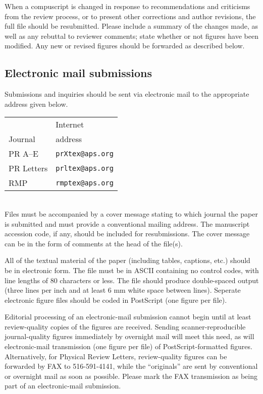 When a compuscript is changed in response to recommendations and criticisms
from the review process, or to present other corrections and author
revisions, the full file should be resubmitted. Please include a summary of
the changes made, as well as any rebuttal to reviewer comments; state whether or not figures have been modified. Any
new or revised figures should be forwarded as described below.



\subsection{Electronic mail submissions}

Submissions and inquiries should be sent via electronic mail to the
appropriate address given below.
\begin{quasitable}
\begin{tabular}{@{\hspace{.5in}}ll@{\hspace{.5in}}}
        & Internet \\
Journal & address \\
\hline
PR A--E & \verb+prXtex@aps.org+\tablenotemark[1]  \\
PR Letters & \verb+prltex@aps.org+ \\
RMP & \verb+rmptex@aps.org+ \\
\end{tabular}
\end{quasitable}
\vskip -6pt
 \\

\noindent Files must be accompanied by a cover message stating to which journal the
paper is submitted and must provide a conventional mailing address.
The manuscript accession code, if any, should be included for
resubmissions. The cover message can be in the form of comments at the
head of the file(s).

All of the textual material of the paper (including tables, captions,
etc.) should be in electronic form. The file must be in ASCII
containing no control codes, with line lengths of 80 characters or
less. The file should produce double-spaced output (three lines per
inch and at least 6 mm white space between lines). Seperate electronic
figure files should be coded in PostScript (one figure per file). 

Editorial processing of an electronic-mail submission cannot begin
until at least review-quality copies of the figures are received.
Sending scanner-reproducible journal-quality figures immediately by
overnight mail will meet this need, as will electronic-mail
transmission (one figure per file) of PostScript-formatted figures.
Alternatively, for Physical Review Letters, review-quality figures can
be forwarded by FAX to 516-591-4141, while the ``originals'' are sent
by conventional or overnight mail as soon as possible. Please mark the
FAX transmission as being part of an electronic-mail submission. 

